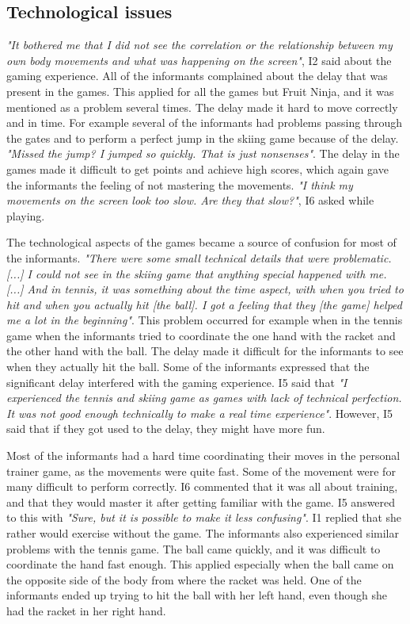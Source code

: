 \subsection{Technological issues}

\emph{"It bothered me that I did not see the correlation or the relationship between my own body movements and what was happening on the screen"}, I2 said about the gaming experience. All of the informants complained about the delay that was present in the games. This applied for all the games but Fruit Ninja, and it was mentioned as a problem several times. The delay made it hard to move correctly and in time. For example several of the informants had problems passing through the gates and to perform a perfect jump in the skiing game because of the delay. \emph{"Missed the jump? I jumped so quickly. That is just nonsenses"}. The delay in the games made it difficult to get points and achieve high scores, which again gave the informants the feeling of not mastering the movements. \emph{"I think my movements on the screen look too slow. Are they that slow?"}, I6 asked while playing. 

The technological aspects of the games became a source of confusion for most of the informants. \emph{"There were some small technical details that were problematic. [...] I could not see in the skiing game that anything special happened with me. [...] And in tennis, it was something about the time aspect, with when you tried to hit and when you actually hit [the ball]. I got a feeling that they [the game] helped me a lot in the beginning"}. This problem occurred for example when in the tennis game when the informants tried to coordinate the one hand with the racket and the other hand with the ball. The delay made it difficult for the informants to see when they actually hit the ball. Some of the informants expressed that the significant delay interfered with the gaming experience. I5 said that \emph{"I experienced the tennis and skiing game as games with lack of technical perfection. It was not good enough technically to make a real time experience"}. However, I5 said that if they got used to the delay, they might have more fun.

Most of the informants had a hard time coordinating their moves in the personal trainer game, as the movements were quite fast. Some of the movement were for many difficult to perform correctly. I6 commented that it was all about training, and that they would master it after getting familiar with the game. I5 answered to this with \emph{"Sure, but it is possible to make it less confusing"}. I1 replied that she rather would exercise without the game. The informants also experienced similar problems with the tennis game. The ball came quickly, and it was difficult to coordinate the hand fast enough. This applied especially when the ball came on the opposite side of the body from where the racket was held. One of the informants ended up trying to hit the ball with her left hand, even though she had the racket in her right hand. 

